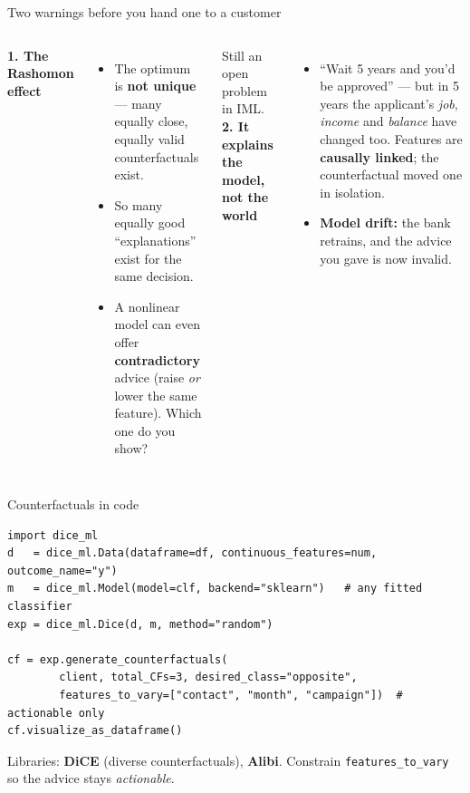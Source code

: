 \documentclass[aspectratio=169]{beamer}
\begin{document}
\begin{frame}{Two warnings before you hand one to a customer}
  \begin{columns}[T]
    \textbf{1. The Rashomon effect}
    \vskip 2pt
    \begin{itemize}\small
      \item The optimum is \textbf{not unique} --- many equally close, equally valid
        counterfactuals exist.
      \item So many equally good ``explanations'' exist for the same decision.
      \item A nonlinear model can even offer \textbf{contradictory} advice (raise \emph{or} lower
        the same feature). Which one do you show?
    \end{itemize}
    \vskip 2pt
    \footnotesize Still an open problem in IML.
    \textbf{2. It explains the model, not the world}
    \vskip 2pt
    \begin{itemize}\small
      \item ``Wait 5 years and you'd be approved'' --- but in 5 years the applicant's \emph{job},
        \emph{income} and \emph{balance} have changed too. Features are
        \textbf{causally linked}; the counterfactual moved one in isolation.
      \item \textbf{Model drift:} the bank retrains, and the advice you gave is now invalid.
    \end{itemize}
    \vskip 4pt
  \end{columns}
\end{frame}

\begin{frame}[fragile]{Counterfactuals in code}
\begin{lstlisting}
import dice_ml
d   = dice_ml.Data(dataframe=df, continuous_features=num, outcome_name="y")
m   = dice_ml.Model(model=clf, backend="sklearn")   # any fitted classifier
exp = dice_ml.Dice(d, m, method="random")

cf = exp.generate_counterfactuals(
        client, total_CFs=3, desired_class="opposite",
        features_to_vary=["contact", "month", "campaign"])  # actionable only
cf.visualize_as_dataframe()
\end{lstlisting}
  \vskip 2pt
  \footnotesize Libraries: \textbf{DiCE} (diverse counterfactuals), \textbf{Alibi}. Constrain
  \texttt{features\_to\_vary} so the advice stays \emph{actionable}.
\end{frame}
\end{document}
